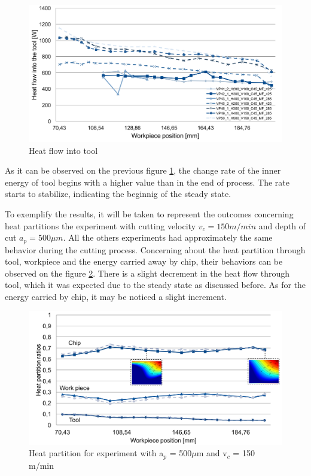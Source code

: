 	\begin{figure}[H]
		\centering
		\captionsetup{justification=centering}
		\includegraphics[scale=0.55]{Imagens/energyTool2.png}
		\caption{Heat flow into tool}
		\label{fig:hflowTool}
	\end{figure}

	As it can be observed on the previous figure \ref{fig:hflowTool}, the change rate of the inner energy of tool begins with a higher value than in the end of process. The rate starts to stabilize, indicating the beginnig of the steady state. 

	To exemplify the results, it will be taken to represent the outcomes concerning heat partitions the experiment with cutting velocity $v_{c} = 150 m/min$ and depth of cut $a_{p} = 500 \mu m$. All the others experiments had approximately the same behavior during the cutting process.
	Concerning about the heat partition through tool, workpiece and the energy carried away by chip, their behaviors can be observed on the figure \ref{fig:hpartExp}. There is a slight decrement in the heat flow through tool, which it was expected due to the steady state as discussed before. As for the energy carried by chip, it may be noticed a slight increment.

	\begin{figure}[H]
		\centering
		\captionsetup{justification=centering}
		\includegraphics[scale=0.55]{Imagens/partition500150.png}
		\caption{Heat partition for experiment with a$_{p}$ = 500$\mu$m and v$_{c}$ = 150 m/min}
		\label{fig:hpartExp}
	\end{figure}

